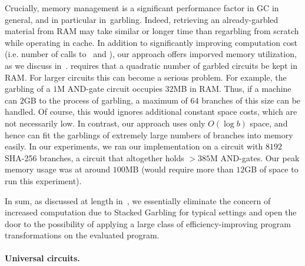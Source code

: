 Crucially, memory management is a significant performance factor in GC
in general, and in particular in~\HK garbling.  Indeed, retrieving an
already-garbled material from RAM may take similar or longer time than
regarbling from scratch while operating in cache.
In addition to significantly improving computation cost (i.e. number
of calls to \Gb\ and \Ev), our approach offers imporved
memory utilization, as we discuss in~.
\HK requires that a quadratic number of
garbled circuits be kept in RAM.  For larger circuits this can become
a serious problem.
For example, the garbling of a $1$M AND-gate circuit
occupies $32$MB in RAM.
Thus, if a machine can $2$GB to the process of garbling, a maximum of
$64$ branches of this size can be handled. Of course, this would
ignores additional constant space costs, which are not necessarily
low.
%
In contrast, our approach uses only $O(\log b)$ space, and hence can
fit the garblings of extremely large numbers of branches into memory
easily.
In our experiments, we ran our implementation on a circuit with $8192$
SHA-256 branches, a circuit that altogether holds $> 385$M AND-gates.
Our peak memory usage was at around $100$MB (\HK would require more
than $12$GB of space to run this experiment).



In sum, as discussed at length
in~, we
essentially eliminate the concern of increased computation due to
Stacked Garbling for typical settings 
and open the door to the possibility of applying a large class of
efficiency-improving program transformations on the evaluated program.


\paragraph{Universal circuits.}

